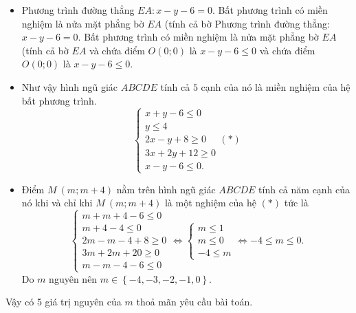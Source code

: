 \begin{bt}
{\begin{itemize}
		\item Phương trình đường thẳng $EA \colon x-y-6=0$. Bất phương trình có miền nghiệm là nửa mặt phẳng bờ $EA$ (tính cả bờ Phương trình đường thẳng: $x-y-6=0$. Bất phương trình có miền nghiệm là nửa mặt phẳng bờ $EA$ (tính cả bờ $EA$ và chứa điểm $O(0;0)$ là $x-y-6\le 0$ và chứa điểm $O(0;0)$ là $x-y-6\le 0$.
		\item Như vậy hình ngũ giác $ABCDE$ tính cả $5$ cạnh của nó là miền nghiệm của hệ bất phương trình.
		\[\left\{\begin{array}{l}
			{x+y-6\le 0} \\
			{y\le 4} \\
			{2x-y+8\ge 0} \\
			{3x+2y+12\ge 0} \\
			{x-y-6\le 0.} 
		\end{array}\right. (*)\] 
		\item Điểm $M\ (m;m+4)$ nằm trên hình ngũ giác $ABCDE$ tính cả năm cạnh của nó khi và chỉ khi $M\ (m;m+4)$ là một nghiệm của hệ $(*)$ tức là \[\left\{\begin{array}{l}
			{m+m+4-6\le 0} \\
			{m+4-4\le 0} \\
			{2m-m-4+8\ge 0} \\
			{3m+2m+20\ge 0} \\
			{m-m-4-6\le 0} 
		\end{array}\right. 
		\Leftrightarrow \left\{\begin{array}{l}
			{m\le 1} \\
			{m\le 0} \\
			{-4\le m} 
		\end{array}\right. 
		\Leftrightarrow-4\le m\le 0.\] 
		Do $m$ nguyên nên $m\in \left\{-4,-3,-2,-1{,}0\right\}$.
	\end{itemize}
		Vậy có 5 giá trị nguyên của $m$ thoả mãn yêu cầu bài toán.
	}
\end{bt}


